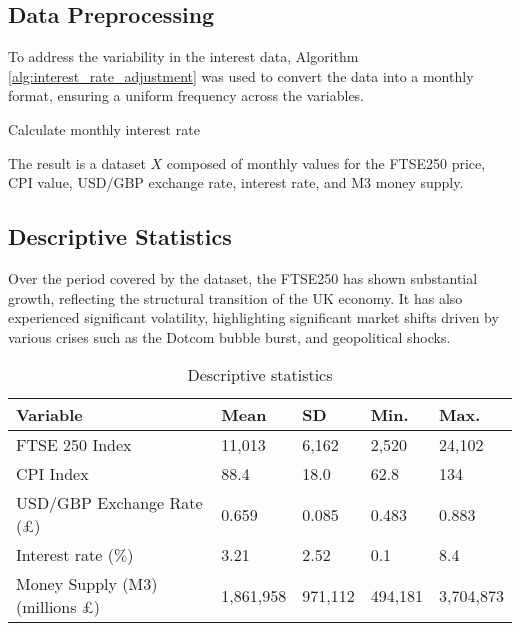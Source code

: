 \documentclass[11pt,a4paper]{article}
\begin{document}
\subsection{Data Preprocessing}
\label{section: prep}

To address the variability in the interest data, Algorithm \ref{alg:interest_rate_adjustment}
was used to convert the data into a monthly format, ensuring a uniform
frequency across the variables.


\begin{algorithm}[H]
    \caption{Calculate monthly interest rate}
    \label{alg:interest_rate_adjustment}
    
\end{algorithm}

The result is a dataset $X$ composed of monthly values for the FTSE250
price, CPI value, USD/GBP exchange rate, interest rate, and M3 money supply. 

\subsection{Descriptive Statistics}

Over the period covered by the dataset, the FTSE250 has 
shown substantial growth, reflecting the structural transition of the UK economy.
It has also experienced significant volatility, highlighting significant market shifts driven by 
various crises such as the Dotcom bubble burst, and geopolitical shocks.

\begin{table}[h!]
    \centering
    \caption{Descriptive statistics}
    \begin{tabular}{lllll}
        \toprule
        \textbf{Variable} & \textbf{Mean} & \textbf{SD} &  \textbf{Min.} & \textbf{Max.}\\
        \midrule
        FTSE 250 Index &  11,013 & 6,162 & 2,520 & 24,102 \\
        CPI Index &  88.4 & 18.0 & 62.8 & 134 \\
        USD/GBP Exchange Rate (£) &  0.659 & 0.085 & 0.483 & 0.883 \\
        Interest rate ($\%$) &  3.21 & 2.52 & 0.1 & 8.4 \\
        Money Supply (M3) (millions £) &  1,861,958 & 971,112 & 494,181 & 3,704,873 \\
        \bottomrule
    \end{tabular}
\end{table}
\end{document}
